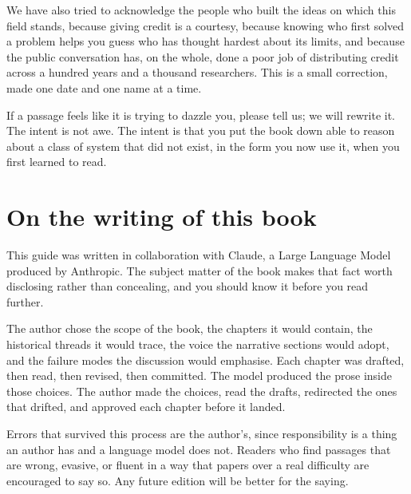 We have also tried to acknowledge the people who built the ideas
on which this field stands, because giving credit is a courtesy,
because knowing who first solved a problem helps you guess who
has thought hardest about its limits, and because the public
conversation has, on the whole, done a poor job of distributing
credit across a hundred years and a thousand researchers. This is
a small correction, made one date and one name at a time.

If a passage feels like it is trying to dazzle you, please tell
us; we will rewrite it. The intent is not awe. The intent is that
you put the book down able to reason about a class of system
that did not exist, in the form you now use it, when you first learned to read.


\section*{On the writing of this book}

This guide was written in collaboration with Claude, a Large
Language Model produced by Anthropic. The subject matter of the
book makes that fact worth disclosing rather than concealing,
and you should know it before you read further.

The author chose the scope of the book, the chapters it would
contain, the historical threads it would trace, the voice the
narrative sections would adopt, and the failure modes the
discussion would emphasise. Each chapter was drafted, then read,
then revised, then committed. The model produced the prose
inside those choices. The author made the choices, read the
drafts, redirected the ones that drifted, and approved each
chapter before it landed.

Errors that survived this process are the author's, since
responsibility is a thing an author has and a language model
does not. Readers who find passages that are wrong, evasive, or
fluent in a way that papers over a real difficulty are
encouraged to say so. Any future edition will be better for the
saying.

